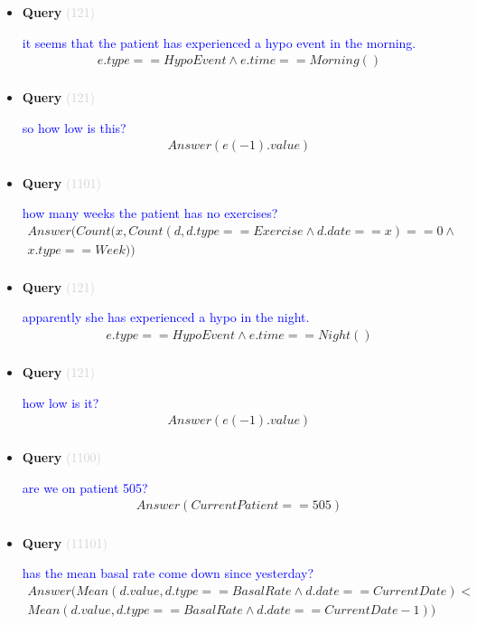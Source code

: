 \documentclass[11pt]{article}
\newcommand{\key}[1]{\textcolor{lightgray}{#1}}
\newcounter{CQuery}
\begin{document}
\begin{itemize}
\item
\textbf{Query\theCQuery} \key{(121)} \addtocounter{CQuery}{1}
\textcolor{blue}{ it seems that the patient has experienced a hypo event in the morning. }
\begin{multline*}
e.type==HypoEvent \wedge e.time==Morning() \\ 
\end{multline*}


\item
\textbf{Query\theCQuery} \key{(121)} \addtocounter{CQuery}{1}
\textcolor{blue}{ so how low is this? }
\begin{multline*}
Answer(e(-1).value) \\ 
\end{multline*}


\item
\textbf{Query\theCQuery} \key{(1101)} \addtocounter{CQuery}{1}
\textcolor{blue}{ how many weeks the patient has no exercises? }
\begin{multline*}
Answer(Count(x, Count(d, d.type==Exercise \wedge d.date==x)==0 \wedge \\ 
x.type==Week)) \\ 
\end{multline*}


\item
\textbf{Query\theCQuery} \key{(121)} \addtocounter{CQuery}{1}
\textcolor{blue}{ apparently she has experienced a hypo in the night. }
\begin{multline*}
e.type==HypoEvent \wedge e.time==Night() \\ 
\end{multline*}


\item
\textbf{Query\theCQuery} \key{(121)} \addtocounter{CQuery}{1}
\textcolor{blue}{ how low is it? }
\begin{multline*}
Answer(e(-1).value) \\ 
\end{multline*}


\item
\textbf{Query\theCQuery} \key{(1100)} \addtocounter{CQuery}{1}
\textcolor{blue}{ are we on patient 505? }
\begin{multline*}
Answer(CurrentPatient==505) \\ 
\end{multline*}


\item
\textbf{Query\theCQuery} \key{(11101)} \addtocounter{CQuery}{1}
\textcolor{blue}{ has the mean basal rate come down since yesterday? }
\begin{multline*}
Answer(Mean(d.value, d.type==BasalRate \wedge d.date==CurrentDate) < \\ 
Mean(d.value, d.type==BasalRate \wedge d.date==CurrentDate-1)) \\ 
\end{multline*}



\end{itemize}
\end{document}
